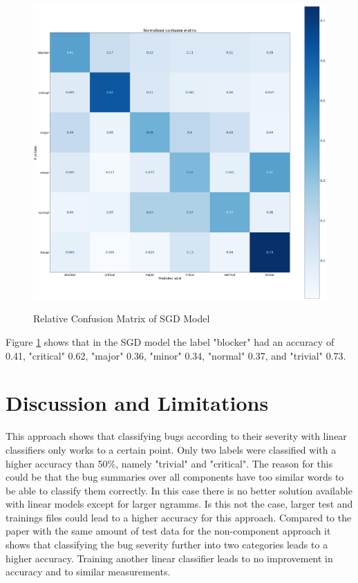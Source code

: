 \documentclass[sigconf,screen]{acmart}
\begin{document}
\begin{figure}[h]
	\caption{Relative Confusion Matrix of SGD Model}
	\centering
	\includegraphics[scale=0.1]{norm_conf_matrix_sgd}
	\label{fig:confMatSGD}	
\end{figure}

Figure \ref{fig:confMatSGD} shows that in the SGD model the label "blocker" had an accuracy of 0.41, "critical"  0.62, "major" 0.36, "minor" 0.34, "normal" 0.37, and "trivial" 0.73.


\section{Discussion and Limitations}
This approach shows that classifying bugs according to their severity with linear classifiers only works to a certain point. Only two labels were classified with a higher accuracy than 50\%, namely "trivial" and "critical". The reason for this could be that the bug summaries over all components have too similar words to be able to classify them correctly. In this case there is no better solution available with linear models except for larger ngramms. Is this not the case, larger test and trainings files could lead to a higher accuracy for this approach. Compared to the paper \cite{ourPaper} with the same amount of test data for the non-component approach it shows that classifying the bug severity further into two categories leads to a higher accuracy. Training another linear classifier leads to no improvement in accuracy and to similar measurements.
\end{document}
